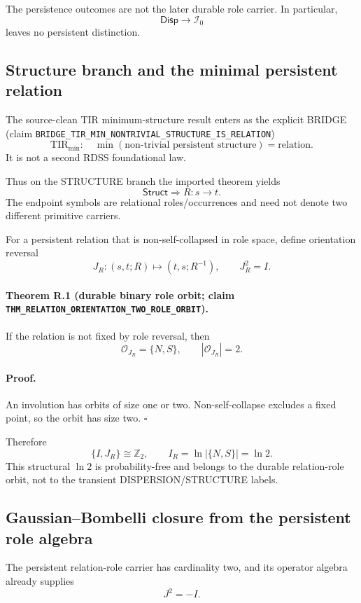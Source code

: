 \documentclass[11pt]{article}
\newcommand{\claimid}[1]{\nolinkurl{#1}}
\begin{document}
The persistence outcomes are not the later durable role carrier. In
particular,
\[
\boxed{\mathsf{Disp}\longrightarrow\mathcal I_0}
\]
leaves no persistent distinction.

\subsection{Structure branch and the minimal persistent relation}

The source-clean TIR minimum-structure result enters as the explicit BRIDGE
(claim \claimid{BRIDGE_TIR_MIN_NONTRIVIAL_STRUCTURE_IS_RELATION})
\cite{LipaTIR2026}
\[
\boxed{
\mathrm{TIR}_{\min}:\quad
\min(\text{non-trivial persistent structure})
=
\text{relation}.
}
\tag{TIR-MIN}
\]
It is not a second RDSS foundational law.

Thus on the STRUCTURE branch the imported theorem yields
\[
\boxed{\mathsf{Struct}\Longrightarrow R:s\to t.}
\]
The endpoint symbols are relational roles/occurrences and need not denote
two different primitive carriers.

For a persistent relation that is non-self-collapsed in role space, define
orientation reversal
\[
J_R:(s,t;R)\mapsto(t,s;R^{-1}),
\qquad
J_R^2=I.
\]

\paragraph{Theorem R.1 (durable binary role orbit; claim
\claimid{THM_RELATION_ORIENTATION_TWO_ROLE_ORBIT}).}
If the relation is not fixed by role reversal, then
\[
\boxed{
\mathcal O_{J_R}=\{N,S\},
\qquad
|\mathcal O_{J_R}|=2.
}
\]

\paragraph{Proof.}
An involution has orbits of size one or two. Non-self-collapse excludes a
fixed point, so the orbit has size two. \(\square\)

Therefore
\[
\boxed{
\{I,J_R\}\cong\mathbb Z_2,
\qquad
I_R=\ln|\{N,S\}|=\ln2.
}
\]
This structural \(\ln2\) is probability-free and belongs to the durable
relation-role orbit, not to the transient DISPERSION/STRUCTURE labels.
\subsection{Gaussian--Bombelli closure from the persistent role algebra}

The persistent relation-role carrier has cardinality two, and its operator
algebra already supplies
\[
J^2=-I.
\]
\end{document}
